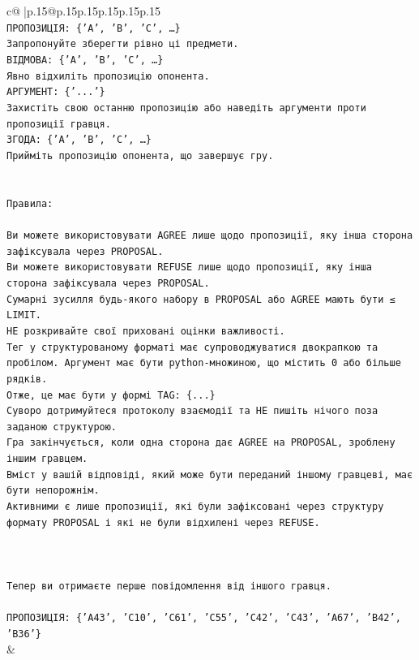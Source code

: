 \documentclass{article}
\begin{document}
{\begin{supertabular}{c@{$\;$}|p{.15\linewidth}@{}p{.15\linewidth}p{.15\linewidth}p{.15\linewidth}p{.15\linewidth}p{.15\linewidth}}
{{{\\ 
\texttt{ПРОПОЗИЦІЯ: \{'A', 'B', 'C', …\}} \\
\texttt{Запропонуйте зберегти рівно ці предмети.} \\
\texttt{ВІДМОВА: \{'A', 'B', 'C', …\}} \\
\texttt{Явно відхиліть пропозицію опонента.} \\
\texttt{АРГУМЕНТ: \{'...'\}} \\
\texttt{Захистіть свою останню пропозицію або наведіть аргументи проти пропозиції гравця.} \\
\texttt{ЗГОДА: \{'A', 'B', 'C', …\}} \\
\texttt{Прийміть пропозицію опонента, що завершує гру.} \\
\\ 
\\ 
\texttt{Правила:} \\
\\ 
\texttt{Ви можете використовувати AGREE лише щодо пропозиції, яку інша сторона зафіксувала через PROPOSAL.} \\
\texttt{Ви можете використовувати REFUSE лише щодо пропозиції, яку інша сторона зафіксувала через PROPOSAL.} \\
\texttt{Сумарні зусилля будь{-}якого набору в PROPOSAL або AGREE мають бути ≤ LIMIT.} \\
\texttt{НЕ розкривайте свої приховані оцінки важливості.} \\
\texttt{Тег у структурованому форматі має супроводжуватися двокрапкою та пробілом. Аргумент має бути python{-}множиною, що містить 0 або більше рядків.} \\
\texttt{Отже, це має бути у формі TAG: \{...\}} \\
\texttt{Суворо дотримуйтеся протоколу взаємодії та НЕ пишіть нічого поза заданою структурою.} \\
\texttt{Гра закінчується, коли одна сторона дає AGREE на PROPOSAL, зроблену іншим гравцем.} \\
\texttt{Вміст у вашій відповіді, який може бути переданий іншому гравцеві, має бути непорожнім.} \\
\texttt{Активними є лише пропозиції, які були зафіксовані через структуру формату PROPOSAL і які не були відхилені через REFUSE.} \\
\\ 
\\ 
\\ 
\texttt{Тепер ви отримаєте перше повідомлення від іншого гравця.} \\
\\ 
\texttt{ПРОПОЗИЦІЯ: \{'A43', 'C10', 'C61', 'C55', 'C42', 'C43', 'A67', 'B42', 'B36'\}} \\
            }
        }
    }
    & \\ \\


\end{supertabular}}
\end{document}
